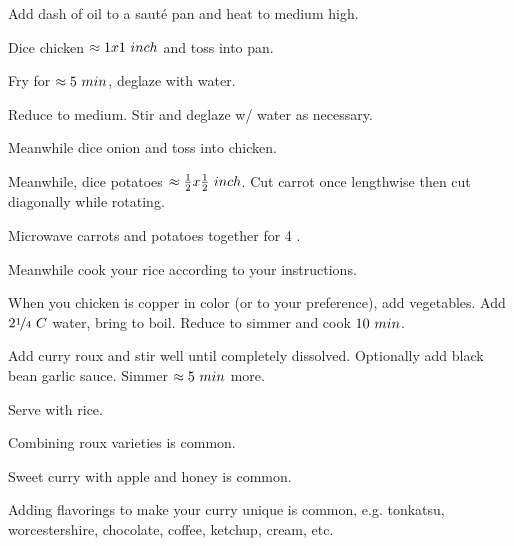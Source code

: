 \begin{preparation}
\item Add dash of oil to a saut\'{e} pan and heat to medium high.

\item Dice chicken $\approx1x1~\inch$ and toss into pan.

\item Fry for $\approx 5~\minute$, deglaze with water.

\item Reduce to medium.
	Stir and deglaze w/ water as necessary.

\item Meanwhile dice onion and toss into chicken.

\item Meanwhile, dice potatoes $\approx \frac{1}{2} x \frac{1}{2}~\inch$.
	Cut carrot once lengthwise then cut diagonally while rotating.

\item Microwave carrots and potatoes together for 4 \minute.

\item Meanwhile cook your rice according to your instructions.

\item When you chicken is copper in color (or to your preference), add vegetables.
	Add $2 \onefourth~C$ water, bring to boil.
	Reduce to simmer and cook $10~\minute$.

\item Add curry roux and stir well until completely dissolved.
	Optionally add black bean garlic sauce.
	Simmer $\approx5~\minute$ more.

\item Serve with rice.
\end{preparation}


\begin{variation}
\item Combining roux varieties is common.

\item Sweet curry with apple and honey is common.

\item Adding flavorings to make your curry unique is common, e.g. tonkatsu, worcestershire, chocolate, coffee, ketchup, cream, etc.
\end{variation}


\recipeend
